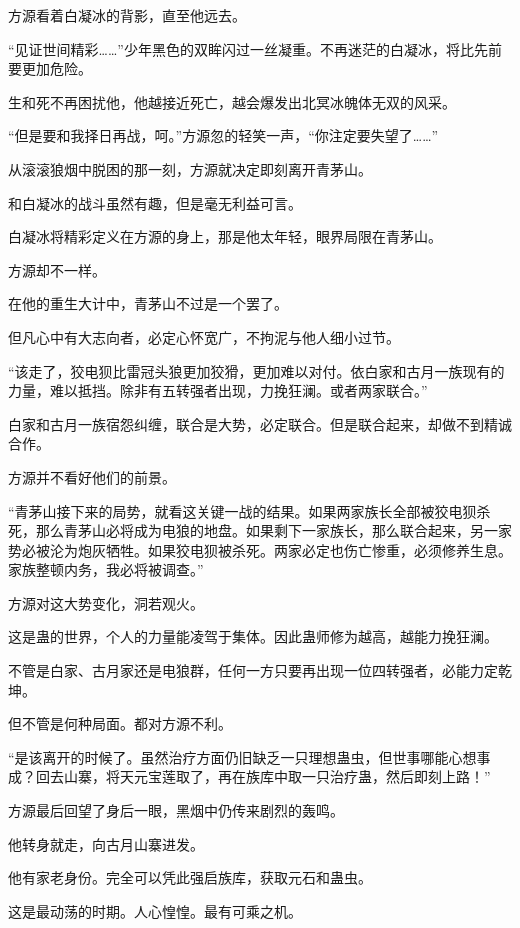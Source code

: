 
\begin{this_body}

方源看着白凝冰的背影，直至他远去。

“见证世间精彩……”少年黑色的双眸闪过一丝凝重。不再迷茫的白凝冰，将比先前要更加危险。

生和死不再困扰他，他越接近死亡，越会爆发出北冥冰魄体无双的风采。

“但是要和我择日再战，呵。”方源忽的轻笑一声，“你注定要失望了……”

从滚滚狼烟中脱困的那一刻，方源就决定即刻离开青茅山。

和白凝冰的战斗虽然有趣，但是毫无利益可言。

白凝冰将精彩定义在方源的身上，那是他太年轻，眼界局限在青茅山。

方源却不一样。

在他的重生大计中，青茅山不过是一个罢了。

但凡心中有大志向者，必定心怀宽广，不拘泥与他人细小过节。

“该走了，狡电狈比雷冠头狼更加狡猾，更加难以对付。依白家和古月一族现有的力量，难以抵挡。除非有五转强者出现，力挽狂澜。或者两家联合。”

白家和古月一族宿怨纠缠，联合是大势，必定联合。但是联合起来，却做不到精诚合作。

方源并不看好他们的前景。

“青茅山接下来的局势，就看这关键一战的结果。如果两家族长全部被狡电狈杀死，那么青茅山必将成为电狼的地盘。如果剩下一家族长，那么联合起来，另一家势必被沦为炮灰牺牲。如果狡电狈被杀死。两家必定也伤亡惨重，必须修养生息。家族整顿内务，我必将被调查。”

方源对这大势变化，洞若观火。

这是蛊的世界，个人的力量能凌驾于集体。因此蛊师修为越高，越能力挽狂澜。

不管是白家、古月家还是电狼群，任何一方只要再出现一位四转强者，必能力定乾坤。

但不管是何种局面。都对方源不利。

“是该离开的时候了。虽然治疗方面仍旧缺乏一只理想蛊虫，但世事哪能心想事成？回去山寨，将天元宝莲取了，再在族库中取一只治疗蛊，然后即刻上路！”

方源最后回望了身后一眼，黑烟中仍传来剧烈的轰鸣。

他转身就走，向古月山寨进发。

他有家老身份。完全可以凭此强启族库，获取元石和蛊虫。

这是最动荡的时期。人心惶惶。最有可乘之机。


\end{this_body}
